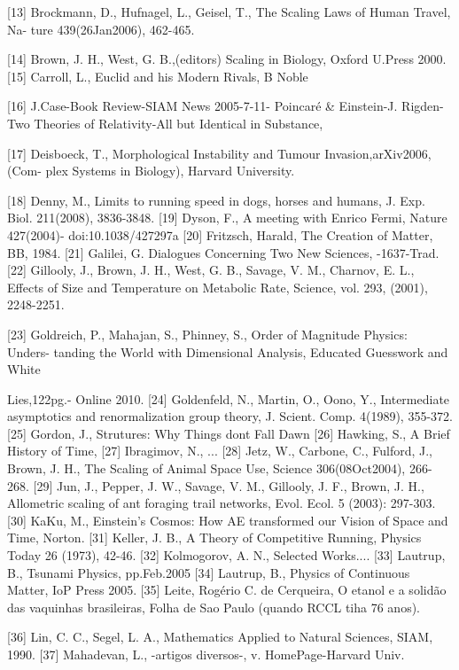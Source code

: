 [13] Brockmann, D., Hufnagel, L., Geisel, T., The Scaling Laws of Human Travel, Na-
ture 439(26Jan2006), 462-465.

[14] Brown, J. H., West, G. B.,(editors) Scaling in Biology, Oxford U.Press 2000.
[15] Carroll, L., Euclid and his Modern Rivals, B Noble

[16] J.Case-Book Review-SIAM News 2005-7-11- Poincaré & Einstein-J. Rigden- Two
Theories of Relativity-All but Identical in Substance,

[17] Deisboeck, T., Morphological Instability and Tumour Invasion,arXiv2006, (Com-
plex Systems in Biology), Harvard University.

[18] Denny, M., Limits to running speed in dogs, horses and humans, J. Exp. Biol.
211(2008), 3836-3848.
[19] Dyson, F., A meeting with Enrico Fermi, Nature 427(2004)- doi:10.1038/427297a
[20] Fritzsch, Harald, The Creation of Matter, BB, 1984.
[21] Galilei, G. Dialogues Concerning Two New Sciences, -1637-Trad.
[22] Gillooly, J., Brown, J. H., West, G. B., Savage, V. M., Charnov, E. L., Effects of
Size and Temperature on Metabolic Rate, Science, vol. 293, (2001), 2248-2251.

[23] Goldreich, P., Mahajan, S., Phinney, S., Order of Magnitude Physics: Unders-
tanding the World with Dimensional Analysis, Educated Guesswork and White

Lies,122pg.- Online 2010.
[24] Goldenfeld, N., Martin, O., Oono, Y., Intermediate asymptotics and renormalization
group theory, J. Scient. Comp. 4(1989), 355-372.
[25] Gordon, J., Strutures: Why Things dont Fall Dawn
[26] Hawking, S., A Brief History of Time,
[27] Ibragimov, N., ...
[28] Jetz, W., Carbone, C., Fulford, J., Brown, J. H., The Scaling of Animal Space Use,
Science 306(08Oct2004), 266-268.
[29] Jun, J., Pepper, J. W., Savage, V. M., Gillooly, J. F., Brown, J. H., Allometric
scaling of ant foraging trail networks, Evol. Ecol. 5 (2003): 297-303.
[30] KaKu, M., Einstein’s Cosmos: How AE transformed our Vision of Space and Time,
Norton.
[31] Keller, J. B., A Theory of Competitive Running, Physics Today 26 (1973), 42-46.
[32] Kolmogorov, A. N., Selected Works....
[33] Lautrup, B., Tsunami Physics, pp.Feb.2005
[34] Lautrup, B., Physics of Continuous Matter, IoP Press 2005.
[35] Leite, Rogério C. de Cerqueira, O etanol e a solidão das vaquinhas brasileiras, Folha
de Sao Paulo (quando RCCL tiha 76 anos).

[36] Lin, C. C., Segel, L. A., Mathematics Applied to Natural Sciences, SIAM, 1990.
[37] Mahadevan, L., -artigos diversos-, v. HomePage-Harvard Univ.

